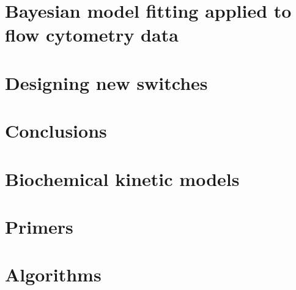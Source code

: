 \documentclass[]{phdthesis}
\begin{document}
\mainmatter*
\chapter{Bayesian model fitting applied to flow cytometry data}
\label{ch:Flow}

%
%

\mainmatter*
\chapter{Designing new switches}
\label{ch:desSw}


\mainmatter*
\chapter{Conclusions}
\label{ch:Conc}


\printbibliography

\appendix*
{}
\chapter{Biochemical kinetic models}
\label{ap:ODEs}

\chapter{Primers}
\label{ap:Prim}

\chapter{Algorithms}
\label{ap:Alg}

\end{document}
